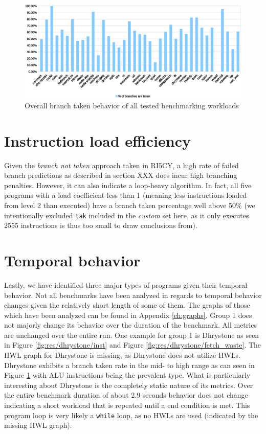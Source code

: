 \documentclass[../bachelor_paper.tex]{subfiles}
\begin{document}
\begin{figure}
    \centering
    \includegraphics[width=\textwidth]{img/graph/overall_branch_tk.eps}
    \caption{Overall branch taken behavior of all tested benchmarking workloads}
    \label{fig:res/overall/branch_tk}
\end{figure}

\section{Instruction load efficiency}
Given the \emph{branch not taken} approach taken in RI5CY, a high rate of failed branch predictions as described in section XXX does incur high branching penalties. However, it can also indicate a loop-heavy algorithm. In fact, all five programs with a load coefficient less than 1 (meaning less instructions loaded from level 2 than executed) have a branch taken percentage well above 50\% (we intentionally excluded \texttt{tak} included in the \emph{custom} set here, as it only executes 2555 instructions is thus too small to draw conclusions from). 

\section{Temporal behavior}
Lastly, we have identified three major types of programs given their temporal behavior. Not all benchmarks have been analyzed in regards to temporal behavior changes given the relatively short length of some of them. The graphs of those which have been analyzed can be found in Appendix \ref{ch:graphs}. Group 1 does not majorly change its behavior over the duration of the benchmark. All metrics are unchanged over the entire run. One example for group 1 is Dhrystone as seen in Figure \ref{fig:res/dhrystone/inst} and Figure \ref{fig:res/dhrystone/fetch_waste}. The \ac{HWL} graph for Dhrystone is missing, as Dhrystone does not utilize \acp{HWL}. Dhrystone exhibits a branch taken rate in the mid- to high range as can seen in Figure \ref{fig:res/overall/branch_tk} with \ac{ALU} instructions being the prevalent type. What is particularly interesting about Dhrystone is the completely static nature of its metrics. Over the entire benchmark duration of about 2.9 seconds behavior does not change indicating a short workload that is repeated until a end condition is met. This program loop is very likely a \texttt{while} loop, as no \acp{HWL} are used (indicated by the missing \ac{HWL} graph).
\end{document}
